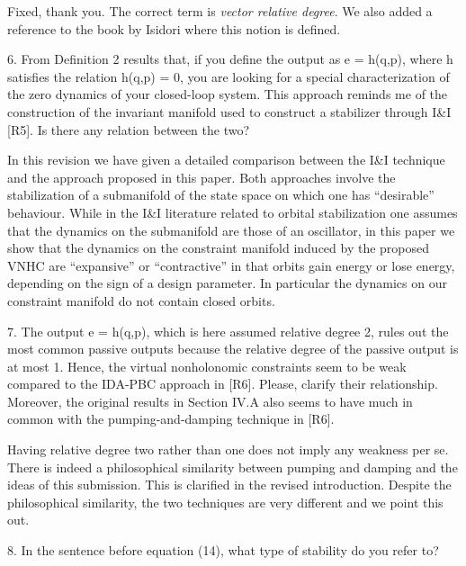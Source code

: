 \documentclass[11pt,letter]{article}
\newenvironment{myquote}{%
\bigskip%
\begin{tcolorbox}[]\footnotesize}{%
\end{tcolorbox}%
\bigskip}
\begin{document}
Fixed, thank you. The correct term is \emph{vector relative degree}. We also added a reference to the book by Isidori where this notion is defined.

\begin{myquote}
6.	From Definition 2 results that, if you define the output as e =
h(q,p), where h satisfies the relation h(q,p) = 0, you are looking for
a special characterization of the zero dynamics of your closed-loop
system. This approach reminds me of the construction of the invariant
manifold used to construct a stabilizer through I\&I [R5]. Is there any
relation between the two?  
\end{myquote}

In this revision we have given a detailed comparison between the  I\&I technique and the approach proposed in this paper. Both approaches involve the stabilization of a submanifold of the state space on which one has ``desirable'' behaviour. While in the I\&I literature related to orbital stabilization one assumes that the dynamics on the submanifold are those of an oscillator, in this paper we show that the dynamics on the constraint manifold induced by the proposed VNHC are ``expansive'' or ``contractive'' in that orbits gain energy or lose energy, depending on the sign of a design parameter. In particular the dynamics on our constraint manifold do not contain closed orbits. 
\begin{myquote}
  7.	The output e = h(q,p), which is here assumed relative degree 2,
rules out the most common passive outputs because the relative degree
of the passive output is at most 1. Hence, the virtual nonholonomic
constraints seem to be weak compared to the IDA-PBC approach in [R6].
Please, clarify their relationship. Moreover, the original results in
Section IV.A also seems to have much in common with the
pumping-and-damping technique in [R6].
\end{myquote}

Having relative degree two rather than one does not imply any weakness per se. There is indeed a philosophical  similarity between pumping and damping and the ideas of this submission. This is clarified in the revised introduction. Despite the philosophical similarity, the two techniques are very different and we point this out.


\begin{myquote}
8.	In the sentence before equation (14), what type of stability do
you refer to? 
\end{myquote}
\end{document}

